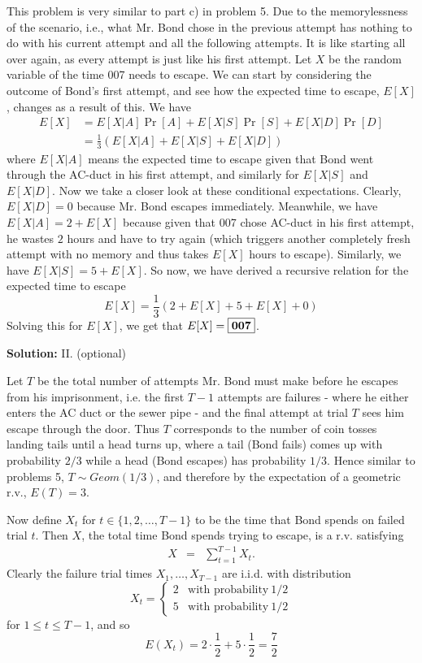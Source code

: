 \documentclass[]{article}
\renewcommand{\answer}[1]{{\color{mydarkblue}\textbf{Solution:}#1}}
\begin{document}
\begin{qunlist}
{{This problem is very similar to part c) in problem 5. Due to the memorylessness of the scenario, i.e., what Mr. Bond chose in the previous attempt has nothing to do with his current attempt and all the following attempts. It is like starting all over again, as every attempt is just like his first attempt. Let $X$ be the random variable of the time 007 needs to escape. We can start by considering the outcome of Bond's first attempt, and see how the expected time to escape, $E[X]$, changes as a result of this. We have
\begin{align*}
E[X] &= E[X|A]\Pr[A] + E[X|S]\Pr[S] + E[X|D]\Pr[D]\\
&= \frac{1}{3}(E[X|A] + E[X|S] + E[X|D])
\end{align*}
where $E[X|A]$ means the expected time to escape given that Bond went through the AC-duct in his first attempt, and similarly for $E[X|S]$ and $E[X|D]$. Now we take a closer look at these conditional expectations. Clearly, $E[X|D] = 0$ because Mr. Bond escapes immediately. Meanwhile, we have $E[X|A] = 2 + E[X]$ because given that 007 chose AC-duct in his first attempt, he wastes $2$ hours and have to try again (which triggers another completely fresh attempt with no memory and thus takes $E[X]$ hours to escape). Similarly, we have $E[X|S] = 5 + E[X]$. So now, we have derived a recursive relation for the expected time to escape
\[ E[X] = \frac{1}{3}(2+E[X] + 5+E[X] + 0)\]
Solving this for $E[X]$, we get that $E[X]=\fbox{\ensuremath{\mathbf{007}}}$.
}

\newpage

\answer{
II. (optional)

Let $T$ be the total number of attempts Mr. Bond must make before he escapes from his imprisonment, i.e. the first $T-1$ attempts are failures - where he either enters the AC duct or the sewer pipe - and the final attempt at trial $T$ sees him escape through the door. Thus $T$ corresponds to the number of coin tosses landing tails until a head turns up, where a tail (Bond fails) comes up with probability $2/3$ while a head (Bond escapes) has probability $1/3$.  Hence similar to problems 5, $T \sim Geom(1/3)$, and therefore by the expectation of a geometric r.v., $E(T) = 3$.

Now define $X_t$ for $t\in\{1,2,\ldots,T-1\}$ to be the time that Bond spends on failed trial $t$.  Then $X$, the total time Bond spends trying to escape, is a r.v. satisfying
\begin{eqnarray} \label{eqn:bond}
X &=& \sum_{t=1}^{T-1} X_t.
\end{eqnarray}
Clearly the failure trial times $X_1,\ldots,X_{T-1}$ are i.i.d. with distribution
\begin{equation*}
X_t = \begin{cases}
    2 & \mbox{with probability}\ 1/2 \\
    5 & \mbox{with probability}\ 1/2
    \end{cases}
\end{equation*}
for $1\le t\le T-1$, and so
\begin{equation*}
E(X_t) =  2\cdot \frac{1}{2} + 5\cdot\frac{1}{2} = \frac{7}{2}
\end{equation*}

}}
\end{qunlist}
\end{document}
